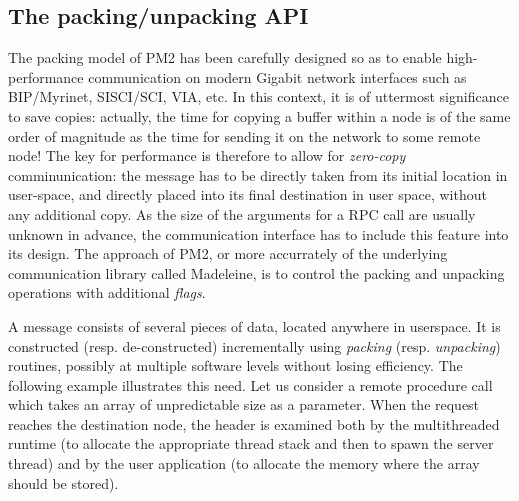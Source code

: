 \subsection{The packing/unpacking API}

The packing model of PM2 has been carefully designed so as to enable
high-performance communication on modern Gigabit network interfaces
such as BIP/Myrinet, SISCI/SCI, VIA, etc. In this context, it is of
uttermost significance to save copies: actually, the time for copying
a buffer within a node is of the same order of magnitude as the time
for sending it on the network to some remote node!  The key for
performance is therefore to allow for \emph{zero-copy}
comminunication: the message has to be directly taken from its initial
location in user-space, and directly placed into its final destination
in user space, without any additional copy. As the size of the
arguments for a RPC call are usually unknown in advance, the
communication interface has to include this feature into its design.
The approach of PM2, or more accurrately of the underlying
communication library called Madeleine, is to control the packing and
unpacking operations with additional \emph{flags}.

A message consists of several pieces of data, located anywhere in
userspace. It is constructed (resp. de-constructed) incrementally
using \emph{packing} (resp. \emph{unpacking}) routines, possibly at
multiple software levels without losing efficiency. The following
example illustrates this need. Let us consider a remote procedure call
which takes an array of unpredictable size as a parameter. When the
request reaches the destination node, the header is examined both by
the multithreaded runtime (to allocate the appropriate thread stack
and then to spawn the server thread) and by the user application (to
allocate the memory where the array should be stored).

